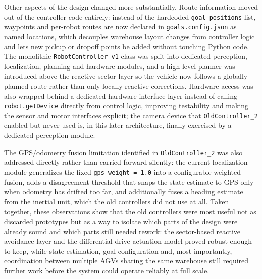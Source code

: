Other aspects of the design changed more substantially. Route information moved out of the controller code entirely: instead of the hardcoded \texttt{goal\_positions} list, waypoints and per-robot routes are now declared in \texttt{goals.config.json} as named locations, which decouples warehouse layout changes from controller logic and lets new pickup or dropoff points be added without touching Python code. The monolithic \texttt{RobotController\_v1} class was split into dedicated perception, localization, planning and hardware modules, and a high-level planner was introduced above the reactive sector layer so the vehicle now follows a globally planned route rather than only locally reactive corrections. Hardware access was also wrapped behind a dedicated hardware-interface layer instead of calling \texttt{robot.getDevice} directly from control logic, improving testability and making the sensor and motor interfaces explicit; the camera device that \texttt{OldController\_2} enabled but never used is, in this later architecture, finally exercised by a dedicated perception module.

The GPS/odometry fusion limitation identified in \texttt{OldController\_2} was also addressed directly rather than carried forward silently: the current localization module generalizes the fixed \texttt{gps\_weight = 1.0} into a configurable weighted fusion, adds a disagreement threshold that snaps the state estimate to GPS only when odometry has drifted too far, and additionally fuses a heading estimate from the inertial unit, which the old controllers did not use at all. Taken together, these observations show that the old controllers were most useful not as discarded prototypes but as a way to isolate which parts of the design were already sound and which parts still needed rework: the sector-based reactive avoidance layer and the differential-drive actuation model proved robust enough to keep, while state estimation, goal configuration and, most importantly, coordination between multiple AGVs sharing the same warehouse still required further work before the system could operate reliably at full scale.
